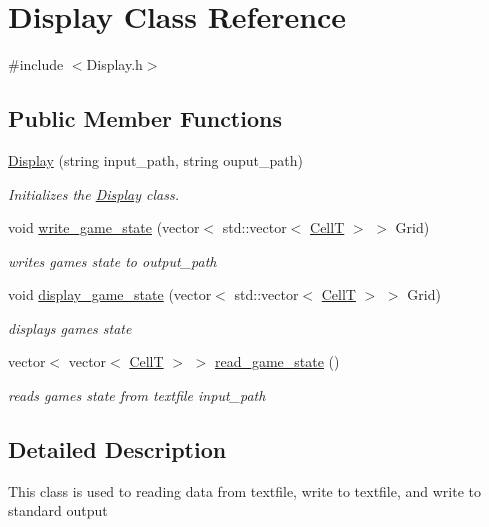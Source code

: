 \hypertarget{class_display}{}\section{Display Class Reference}
\label{class_display}


{\ttfamily \#include $<$Display.\+h$>$}

\subsection*{Public Member Functions}
\begin{DoxyCompactItemize}
\item 
\hyperlink{class_display_a294011e0e01f1eb61c3340771efa3857}{Display} (string input\+\_\+path, string ouput\+\_\+path)
\begin{DoxyCompactList}\small\item\em Initializes the \hyperlink{class_display}{Display} class. \end{DoxyCompactList}\item 
void \hyperlink{class_display_a0fa2553783d7dbff69d0ef634b7a32df}{write\+\_\+game\+\_\+state} (vector$<$ std\+::vector$<$ \hyperlink{struct_cell_t}{CellT} $>$ $>$ Grid)
\begin{DoxyCompactList}\small\item\em writes games state to output\+\_\+path \end{DoxyCompactList}\item 
void \hyperlink{class_display_a20dd2fba68084b31e4a87214749bcfc4}{display\+\_\+game\+\_\+state} (vector$<$ std\+::vector$<$ \hyperlink{struct_cell_t}{CellT} $>$ $>$ Grid)
\begin{DoxyCompactList}\small\item\em displays games state \end{DoxyCompactList}\item 
vector$<$ vector$<$ \hyperlink{struct_cell_t}{CellT} $>$ $>$ \hyperlink{class_display_ace8ae1cb603205311c142fbc0f2fb709}{read\+\_\+game\+\_\+state} ()
\begin{DoxyCompactList}\small\item\em reads games state from textfile input\+\_\+path \end{DoxyCompactList}\end{DoxyCompactItemize}


\subsection{Detailed Description}
This class is used to reading data from textfile, write to textfile, and write to standard output 


